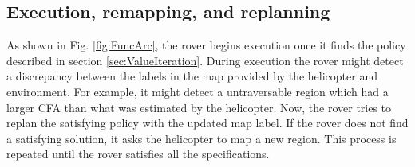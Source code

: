 \documentclass[conference]{IEEEtran}
\newcommand{\sofie}[1]{{\color{purple} [Sofie] #1}}
\begin{document}


\subsection{Execution, remapping, and replanning}
\label{sec:replanning}

As shown in Fig. \ref{fig:FuncArc}, the rover begins execution once it finds the policy described in section \ref{sec:ValueIteration}. 
During execution the rover might detect a discrepancy between the labels in the map provided by the helicopter and environment. 
For example, it might detect a untraversable region which had a larger CFA than what was estimated by the helicopter. 
Now, the rover tries to replan the satisfying policy with the updated map label. If the rover does not find a satisfying solution, it asks the helicopter to map a new region. This process is repeated until the rover satisfies all the specifications.

\end{document}
